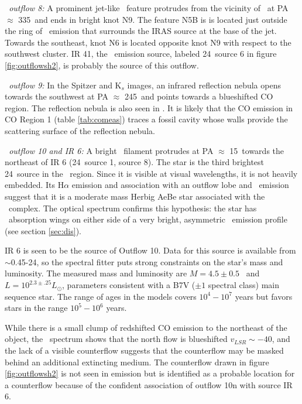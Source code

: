 {\it \region\ outflow 8:}   A prominent jet-like \htwo\ feature protrudes from
the vicinity of \swcluster\ at PA $\approx$ 335\arcdeg\  and ends in
 bright knot %
N9.     The feature N5B is is
located just outside the ring of \htwo\ emission that surrounds the IRAS source
at the base of the jet.  Towards the southeast, %
knot N6 is located opposite knot N9 with respect to the southwest cluster.  IR 41,
the \ha\ emission source, labeled 24\um\ source 6 in figure \ref{fig:outflowsh2},
is probably the source of this outflow.
 
{\it \region\ outflow 9:} In the Spitzer and K$_s$ images, an infrared
reflection nebula opens towards the southwest at PA $\approx$ 245\arcdeg\ and
points towards a blueshifted CO region.  The reflection nebula is also seen in
\ha.  It is likely that the CO emission in CO Region 1 (table \ref{tab:comeas})
traces a fossil cavity whose walls provide the scattering surface of the
reflection nebula.

{\it \region\ outflow 10 and IR 6:}   A bright \htwo\ filament protrudes at PA $\approx$
15\arcdeg\ towards the northeast of IR 6 (24\um\ source 1, \citet{qiu2008}
source 8).  The star is the third brightest 24\um\ source in the \region\
region.   Since it is visible at visual wavelengths, it is not heavily
embedded.     Its  H$\alpha$ emission and association with an outflow lobe and
\htwo\ emission suggest that it is a moderate mass Herbig AeBe star associated
with the \region\ complex.  The optical spectrum confirms this hypothesis: the
star has \ha\ absorption wings on either side of a very bright, asymmetric \ha\
emission profile (see section \ref{sec:dis}). 

IR 6 is seen to be the source of Outflow 10.  Data for this source is available
from $\sim$0.45-24\um, so the \citet{robitaille2007} spectral fitter puts
strong constraints on the star's mass and luminosity.  The measured mass and
luminosity are  $M=4.5\pm0.5$ \msun\ and $L = 10^{2.3\pm.25} L_\odot$, parameters
consistent with a B7V ($\pm 1$ spectral class) main sequence star.  The range
of ages in the models covers $10^4-10^7$ years but favors stars in the range
$10^5-10^6$ years.

While there is a small clump of redshifted CO emission to the northeast of the
object, the \htwo\ spectrum shows that the north flow is blueshifted $v_{LSR}\sim-40
$\kms, and the lack of a visible counterflow suggests that the counterflow may
be masked behind an additional extincting medium.  The counterflow drawn in
figure \ref{fig:outflowsh2} is not seen in emission but is identified as a
probable location for a counterflow because of the confident association of
outflow 10n with source IR 6.

